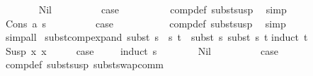 \begin{isabellebody}
\ \ \ \ \ \ \isamarkupfalse%
\ Nil\isanewline
\ \ \ \ \ \ \isamarkupfalse%
\ \isamarkupfalse%
\ {\isacharquery}{\kern0pt}case\isanewline
\ \ \ \ \ \ \ \ \isamarkupfalse%
\ comp{\isacharunderscore}{\kern0pt}def\ subst{\isacharunderscore}{\kern0pt}susp\ \isamarkupfalse%
\ simp\isanewline
\ \ \ \ \isamarkupfalse%
\isanewline
\ \ \ \ \ \ \isamarkupfalse%
\ {\isacharparenleft}{\kern0pt}Cons\ a\ s{\isacharparenright}{\kern0pt}\isanewline
\ \ \ \ \ \ \isamarkupfalse%
\ \isamarkupfalse%
\ {\isacharquery}{\kern0pt}case\ \isanewline
\ \ \ \ \ \ \ \ \isamarkupfalse%
\ comp{\isacharunderscore}{\kern0pt}def\ subst{\isacharunderscore}{\kern0pt}susp\ \isamarkupfalse%
\ simp\isanewline
\ \ \ \ \isamarkupfalse%
\isanewline
\ \ \isamarkupfalse%
\ {\isacharparenleft}{\kern0pt}simp{\isacharunderscore}{\kern0pt}all{\isacharparenright}{\kern0pt}\isanewline
{}\isamarkupfalse%
%
\endisatagproof
{\isafoldproof}%
%
\isadelimproof
\isanewline
%
\endisadelimproof
\isanewline
\isanewline
{}\isamarkupfalse%
\ subst{\isacharunderscore}{\kern0pt}comp{\isacharunderscore}{\kern0pt}expand{\isacharcolon}{\kern0pt}\ {\isachardoublequoteopen}subst\ {\isacharparenleft}{\kern0pt}s{}\ {\isasymbullet}\ s{}{\isacharparenright}{\kern0pt}\ t\ {\isacharequal}{\kern0pt}\ subst\ s{}\ {\isacharparenleft}{\kern0pt}subst\ s{}\ t{\isacharparenright}{\kern0pt}{\isachardoublequoteclose}\isanewline
%
\isadelimproof
%
\endisadelimproof
%
\isatagproof
{}\isamarkupfalse%
{\isacharparenleft}{\kern0pt}induct\ t{\isacharparenright}{\kern0pt}\isanewline
\ \ \isamarkupfalse%
\ {\isacharparenleft}{\kern0pt}Susp\ x{}\ x{}{\isacharparenright}{\kern0pt}\isanewline
\ \ \isamarkupfalse%
\ \isamarkupfalse%
\ {\isacharquery}{\kern0pt}case\ \isanewline
\ \ \ \isamarkupfalse%
{\isacharparenleft}{\kern0pt}induct\ s{}{\isacharparenright}{\kern0pt}\isanewline
\ \ \ \ \ \ \isamarkupfalse%
\ Nil\isanewline
\ \ \ \ \ \ \isamarkupfalse%
\ \isamarkupfalse%
\ {\isacharquery}{\kern0pt}case\ \isamarkupfalse%
\ comp{\isacharunderscore}{\kern0pt}def\ subst{\isacharunderscore}{\kern0pt}susp\ subst{\isacharunderscore}{\kern0pt}swap{\isacharunderscore}{\kern0pt}comm\ \isamarkupfalse%

\end{isabellebody}
